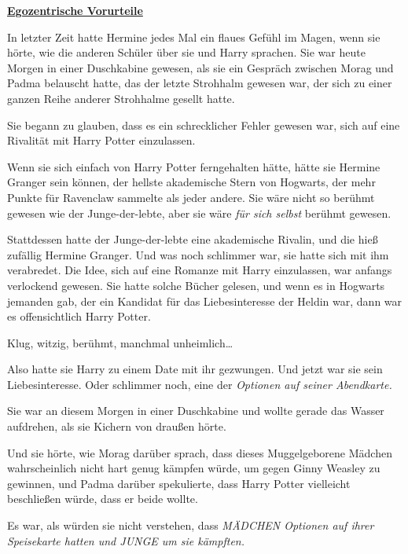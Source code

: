 

\hypertarget{egozentrische-vorurteile}{%

\textbf{\uline{Egozentrische Vorurteile}}

In letzter Zeit hatte Hermine jedes Mal ein flaues Gefühl im Magen, wenn sie hörte, wie die anderen Schüler über sie und Harry sprachen. Sie war heute Morgen in einer Duschkabine gewesen, als sie ein Gespräch zwischen Morag und Padma belauscht hatte, das der letzte Strohhalm gewesen war, der sich zu einer ganzen Reihe anderer Strohhalme gesellt hatte.

Sie begann zu glauben, dass es ein schrecklicher Fehler gewesen war, sich auf eine Rivalität mit Harry Potter einzulassen.

Wenn sie sich einfach von Harry Potter ferngehalten hätte, hätte sie Hermine Granger sein können, der hellste akademische Stern von Hogwarts, der mehr Punkte für Ravenclaw sammelte als jeder andere. Sie wäre nicht so berühmt gewesen wie der Junge-der-lebte, aber sie wäre \emph{für sich selbst} berühmt gewesen.

Stattdessen hatte der Junge-der-lebte eine akademische Rivalin, und die hieß zufällig Hermine Granger. Und was noch schlimmer war, sie hatte sich mit ihm verabredet. Die Idee, sich auf eine Romanze mit Harry einzulassen, war anfangs verlockend gewesen. Sie hatte solche Bücher gelesen, und wenn es in Hogwarts jemanden gab, der ein Kandidat für das Liebesinteresse der Heldin war, dann war es offensichtlich Harry Potter.

Klug, witzig, berühmt, manchmal unheimlich…

Also hatte sie Harry zu einem Date mit ihr gezwungen. Und jetzt war sie sein Liebesinteresse. Oder schlimmer noch, eine der \emph{Optionen auf seiner Abendkarte.}

Sie war an diesem Morgen in einer Duschkabine und wollte gerade das Wasser aufdrehen, als sie Kichern von draußen hörte.

Und sie hörte, wie Morag darüber sprach, dass dieses Muggelgeborene Mädchen wahrscheinlich nicht hart genug kämpfen würde, um gegen Ginny Weasley zu gewinnen, und Padma darüber spekulierte, dass Harry Potter vielleicht beschließen würde, dass er beide wollte.

Es war, als würden sie nicht verstehen, dass \emph{MÄDCHEN Optionen auf ihrer Speisekarte hatten und JUNGE um sie kämpften.}

}
